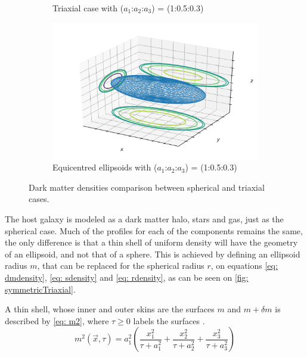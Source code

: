 \begin{figure}[h]
\begin{subfigure}[t]{0.49\textwidth}
				\caption{Triaxial case with ($a_1$:$a_2$:$a_3$) = (1:0.5:0.3)}
				\label{fig: triaxialDensity3d}
			\end{subfigure}
			\begin{subfigure}[t]{0.6\textwidth}
				\includegraphics[width=\textwidth]{"../Files/Week 7/ellipsoid_"}
				\caption{Equicentred ellipsoids with ($a_1$:$a_2$:$a_3$) = (1:0.5:0.3)}
			\end{subfigure}
			\caption{Dark matter densities comparison between spherical and triaxial cases.}
			\label{fig: symmetricTriaxial}
		\end{figure}
	
		The host galaxy is modeled as a dark matter halo, stars and gas, just as the spherical case. Much of the profiles for each of the components remains the same, the only difference is that a thin shell of uniform density will have the geometry of an ellipsoid, and not that of a sphere. This is achieved by defining an ellipsoid radius $m$, that can be replaced for the spherical radius $r$, on equations \ref{eq: dmdensity}, \ref{eq: sdensity} and \autoref{eq: rdensity}, as can be seen on \autoref{fig: symmetricTriaxial}. 
		
		A thin shell, whose inner and outer skins are the surfaces $m$ and $m + \delta m$ is described by \autoref{eq: m2}, where $\tau \geq 0$ labels the surfaces \cite{binney2011galactic}.
		\begin{equation}\label{eq: m2}
		m^2(\vec{x}, \tau) = a_1^2\left(\frac{x_1^{2}}{\tau + a_{1}^{2}} + \frac{x_2^{2}}{\tau + a_{2}^{2}} + \frac{x_3^{2}}{\tau + a_{3}^{2}}\right)
		\end{equation}
		
